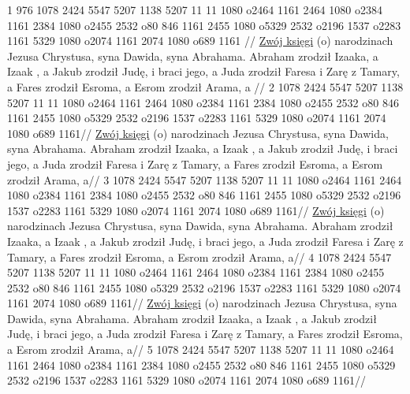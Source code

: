 \renewcommand{\chaptertitle}{Mateusza}
\begingl
\lettrine[loversize=1,lraise=-1.3]{1 }{}%
\gla 
{} 976 {} 1078 2424 5547 5207 1138 5207 11 {} 11 1080 o2464 1161 2464 1080
o2384 1161 2384 1080 o2455 2532 o80 {} 846 {} 1161 2455 1080 o5329 2532 o2196 
1537 o2283 1161 5329 1080 o2074 1161 2074 1080 o689 {} 1161
//
\glb 
{} \underline{Zwój księgi} (o) narodzinach Jezusa Chrystusa, syna Dawida, syna Abrahama. 
 Abraham zrodził Izaaka, a Izaak , a Jakub zrodził Judę, i braci jego, 
 a Juda zrodził Faresa i Zarę z Tamary, a Fares zrodził Esroma, a Esrom zrodził Arama, 
 a
//
\endgl
\begingl\lettrine[loversize=1,lraise=-1.3]{2 }{}%
 {} 1078 2424 5547 5207 1138 5207 11 {} 11 1080 o2464 1161 2464 1080 o2384 1161 2384 1080 o2455 2532 o80 846 {} 1161 2455 1080 o5329 2532 o2196 1537 o2283 1161 5329 1080 o2074 1161 2074 1080 o689 {} 1161//
\glb \underline{Zwój księgi} (o) narodzinach Jezusa Chrystusa, syna Dawida, syna Abrahama.  Abraham zrodził Izaaka, a Izaak , a Jakub zrodził Judę, i braci jego,  a Juda zrodził Faresa i Zarę z Tamary, a Fares zrodził Esroma, a Esrom zrodził Arama,  a//
\endgl
\begingl\lettrine[loversize=1,lraise=-1.3]{3 }{}%
 {} 1078 2424 5547 5207 1138 5207 11 {} 11 1080 o2464 1161 2464 1080 o2384 1161 2384 1080 o2455 2532 o80 846 {} 1161 2455 1080 o5329 2532 o2196 1537 o2283 1161 5329 1080 o2074 1161 2074 1080 o689 {} 1161//
\glb \underline{Zwój księgi} (o) narodzinach Jezusa Chrystusa, syna Dawida, syna Abrahama.  Abraham zrodził Izaaka, a Izaak , a Jakub zrodził Judę, i braci jego,  a Juda zrodził Faresa i Zarę z Tamary, a Fares zrodził Esroma, a Esrom zrodził Arama,  a//
\endgl
\begingl\lettrine[loversize=1,lraise=-1.3]{4 }{}%
 {} 1078 2424 5547 5207 1138 5207 11 {} 11 1080 o2464 1161 2464 1080 o2384 1161 2384 1080 o2455 2532 o80 846 {} 1161 2455 1080 o5329 2532 o2196 1537 o2283 1161 5329 1080 o2074 1161 2074 1080 o689 {} 1161//
\glb \underline{Zwój księgi} (o) narodzinach Jezusa Chrystusa, syna Dawida, syna Abrahama.  Abraham zrodził Izaaka, a Izaak , a Jakub zrodził Judę, i braci jego,  a Juda zrodził Faresa i Zarę z Tamary, a Fares zrodził Esroma, a Esrom zrodził Arama,  a//
\endgl
\begingl\lettrine[loversize=1,lraise=-1.3]{5 }{}%
 {} 1078 2424 5547 5207 1138 5207 11 {} 11 1080 o2464 1161 2464 1080 o2384 1161 2384 1080 o2455 2532 o80 846 {} 1161 2455 1080 o5329 2532 o2196 1537 o2283 1161 5329 1080 o2074 1161 2074 1080 o689 {} 1161//
